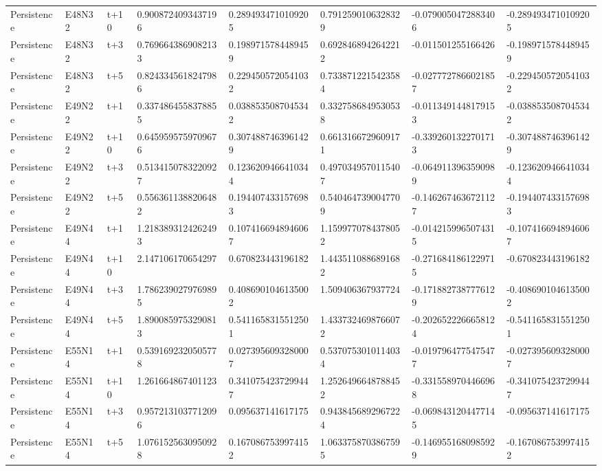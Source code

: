 \begin{landscape}
\begin{longtable}{llllllll}
Persistence & E48N32 & t+10 & 0.9008724093437196 & 0.2894934710109205 & 0.7912590106328329 & -0.0790050472883406 & -0.2894934710109205 \\
Persistence & E48N32 & t+3 & 0.7696643869082133 & 0.1989715784489459 & 0.6928468942642212 & -0.011501255166426 & -0.1989715784489459 \\
Persistence & E48N32 & t+5 & 0.8243345618247986 & 0.2294505720541032 & 0.7338712215423584 & -0.0277727866021857 & -0.2294505720541032 \\
Persistence & E49N22 & t+1 & 0.3374864558378855 & 0.0388535087045342 & 0.3327586849530538 & -0.0113491448179153 & -0.0388535087045342 \\
Persistence & E49N22 & t+10 & 0.6459595759709676 & 0.3074887463961429 & 0.6613166729609171 & -0.3392601322701713 & -0.3074887463961429 \\
Persistence & E49N22 & t+3 & 0.5134150783220927 & 0.1236209466410344 & 0.4970349570115407 & -0.0649113963590989 & -0.1236209466410344 \\
Persistence & E49N22 & t+5 & 0.5563611388206482 & 0.1944074331576983 & 0.5404647390047709 & -0.1462674636721127 & -0.1944074331576983 \\
Persistence & E49N44 & t+1 & 1.2183893124262493 & 0.1074166948946067 & 1.1599770784378052 & -0.0142159965074315 & -0.1074166948946067 \\
Persistence & E49N44 & t+10 & 2.147106170654297 & 0.670823443196182 & 1.4435110886891682 & -0.2716841861229715 & -0.670823443196182 \\
Persistence & E49N44 & t+3 & 1.7862390279769895 & 0.4086901046135002 & 1.509406367937724 & -0.1718827387776129 & -0.4086901046135002 \\
Persistence & E49N44 & t+5 & 1.8900859753290813 & 0.5411658315512501 & 1.4337324698766072 & -0.2026522266658124 & -0.5411658315512501 \\
Persistence & E55N14 & t+1 & 0.5391692320505778 & 0.0273956093280007 & 0.5370753010114034 & -0.0197964775475477 & -0.0273956093280007 \\
Persistence & E55N14 & t+10 & 1.261664867401123 & 0.3410754237299447 & 1.2526496648788452 & -0.3315589704466968 & -0.3410754237299447 \\
Persistence & E55N14 & t+3 & 0.9572131037712096 & 0.095637141617175 & 0.9438456892967224 & -0.0698431204477145 & -0.095637141617175 \\
Persistence & E55N14 & t+5 & 1.0761525630950928 & 0.1670867539974152 & 1.0633758703867595 & -0.1469551680985929 & -0.1670867539974152 \\

\end{longtable}
\end{landscape}
